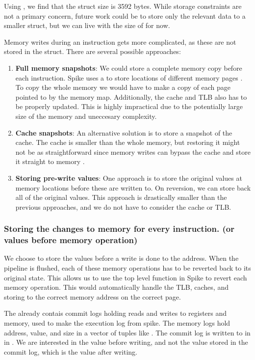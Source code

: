 Using , we find that the struct size is 3592 bytes. While storage constraints are not a primary concern, future work could be to store only the relevant data to a smaller struct, but we can live with the size of  for now. 

Memory writes during an instruction gets more complicated, as these are not stored in the  struct. There are several possible approaches:

\begin{enumerate}
    \item \textbf{Full memory snapshots}: We could store a complete memory copy before each instruction. Spike uses a  to store locations of different memory pages \cite{SpikeRISCVISA2023}. To copy the whole memory we would have to make a copy of each page pointed to by the memory map. Additionally, the cache and TLB also has to be properly updated. This is highly impractical due to the potentially large size of the memory and uneccesary complexity.
    \item \textbf{Cache snapshots}: An alternative solution is to store a snapshot of the cache. The cache is smaller than the whole memory, but restoring it might not be as straightforward since memory writes can bypass the cache and store it straight to memory \cite{hennessyComputerArchitectureQuantitative2019}.
    \item \textbf{Storing pre-write values}: One approach is to store the original values at memory locations before these are written to. On reversion, we can store back all of the original values. This approach is drastically smaller than the previous approaches, and we do not have to consider the cache or TLB.
\end{enumerate}


\subsubsection{Storing the changes to memory for every instruction. (or values before memory operation)}
We choose to store the values before a write is done to the address.
When the pipeline is flushed, each of these memory operations has to be reverted back to its original state. This allows us to use the top level  function in Spike to revert each memory operation. This would automatically handle the TLB, caches, and storing to the correct memory address on the correct page.

The  already contais commit logs holding reads and writes to registers and memory, used to make the execution log from spike. The memory logs hold address, value, and size in a vector of tuples like . The commit log is written to in  in . We are interested in the value before writing, and not the value stored in the commit log, which is the value after writing. 

